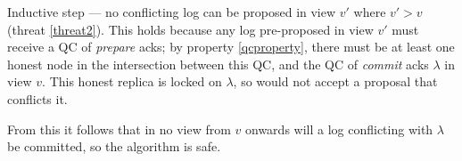 Inductive step --- no conflicting log can be proposed in view $v'$ where $v' > v$ (threat \ref{threat2}). This holds because any log pre-proposed in view $v'$ must receive a QC of \textit{prepare} acks; by property \ref{qcproperty}, there must be at least one honest node in the intersection between this QC, and the QC of \textit{commit} acks $\lambda$ in view $v$. This honest replica is locked on $\lambda$, so would not accept a proposal that conflicts it.

From this it follows that in no view from $v$ onwards will a log conflicting with $\lambda$ be committed, so the algorithm is safe.


